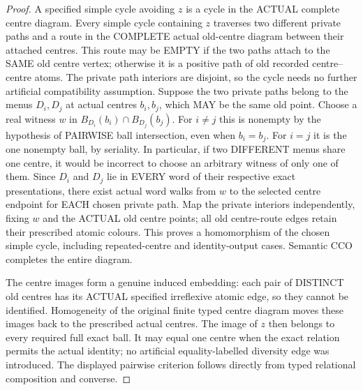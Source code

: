 \begin{proof}
A specified simple cycle avoiding \(z\) is a cycle
in the ACTUAL complete centre diagram. Every simple
cycle containing \(z\) traverses two different
private paths and a route in the COMPLETE
actual old-centre diagram between their
attached centres. This route may be EMPTY
if the two paths attach to the SAME old
centre vertex; otherwise it is a positive
path of old recorded centre--centre atoms.
The private path interiors are disjoint,
so the cycle needs no further artificial
compatibility assumption. Suppose the two private paths belong to the
menus \(D_i,D_j\) at actual centres \(b_i,b_j\),
which MAY be the same old point. Choose a
real witness \(w\) in
\(B_{D_i}(b_i)\cap B_{D_j}(b_j)\).
For \(i\ne j\) this is nonempty by the
hypothesis of PAIRWISE ball intersection,
even when \(b_i=b_j\). For \(i=j\) it
is the one nonempty ball, by seriality.
In particular, if two DIFFERENT menus share
one centre, it would be incorrect to choose
an arbitrary witness of only one of them.
Since \(D_i\) and \(D_j\) lie in EVERY word
of their respective exact presentations,
there exist actual word walks from \(w\)
to the selected centre endpoint for EACH
chosen private path. Map the private
interiors independently, fixing \(w\) and
the ACTUAL old centre points; all old
centre-route edges retain their prescribed
atomic colours. This proves a homomorphism
of the chosen simple cycle, including
repeated-centre and identity-output cases.
Semantic CCO completes the entire diagram.

The centre images form a genuine induced
embedding: each pair of DISTINCT old centres
has its ACTUAL specified irreflexive atomic
edge, so they cannot be identified.
Homogeneity of the original finite typed
centre diagram moves these images back
to the prescribed actual centres. The image
of \(z\) then belongs to every required
full exact ball. It may equal one centre
when the exact relation permits the actual
identity; no artificial equality-labelled
diversity edge was introduced. The displayed pairwise criterion follows directly
from typed relational composition and converse.
\end{proof}

